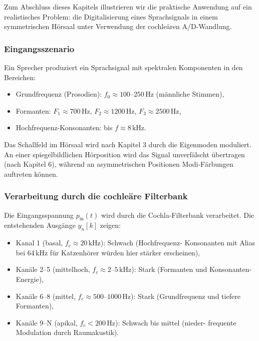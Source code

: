 ﻿\documentclass[12pt, a4paper]{article}
\theoremstyle{definition}
\theoremstyle{remark}
\begin{document}
Zum Abschluss dieses Kapitels illustrieren wir die praktische Anwendung auf ein 
realistisches Problem: die Digitalisierung eines Sprachsignals in einem symmetrischen 
Hörsaal unter Verwendung der cochleären A/D-Wandlung.

\subsubsection{Eingangsszenario}

Ein Sprecher produziert ein Sprachsignal mit spektralen Komponenten in den Bereichen:
\begin{itemize}
\item Grundfrequenz (Prosodien): $f_0 \approx 100$--$250\,\mathrm{Hz}$ (männliche Stimmen),
\item Formanten: $F_1 \approx 700\,\mathrm{Hz}$, $F_2 \approx 1200\,\mathrm{Hz}$, $F_3 \approx 2500\,\mathrm{Hz}$,
\item Hochfrequenz-Konsonanten: bis $f \approx 8\,\mathrm{kHz}$.
\end{itemize}

Das Schallfeld im Hörsaal wird nach Kapitel 3 durch die Eigenmoden moduliert. 
An einer spiegelbildlichen Hörposition wird das Signal unverfälscht übertragen 
(nach Kapitel 6), während an asymmetrischen Positionen Modi-Färbungen auftreten 
können.

\subsubsection{Verarbeitung durch die cochleäre Filterbank}

Die Eingangsspannung $p_{\mathrm{in}}(t)$ wird durch die Cochla-Filterbank verarbeitet. 
Die entstehenden Ausgänge $y_n[k]$ zeigen:

\begin{itemize}
\item Kanal 1 (basal, $f_c \approx 20\,\mathrm{kHz}$): Schwach (Hochfrequenz-
  Konsonanten mit Alias bei 64\,kHz für Katzenhörer würden hier stärker erscheinen),
\item Kanäle 2--5 (mittelhoch, $f_c \approx 2$--$5\,\mathrm{kHz}$): Stark (Formanten 
  und Konsonanten-Energie),
\item Kanäle 6--8 (mittel, $f_c \approx 500$--$1000\,\mathrm{Hz}$): Stark (Grundfrequenz 
  und tiefere Formanten),
\item Kanäle 9--N (apikal, $f_c < 200\,\mathrm{Hz}$): Schwach bis mittel (nieder-
  frequente Modulation durch Raumakustik).
\end{itemize}
\end{document}
